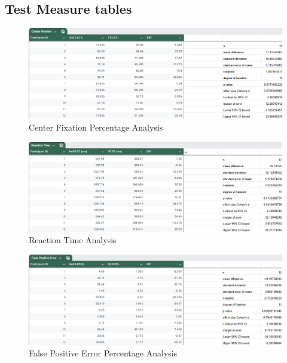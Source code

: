 \documentclass{l4proj}
\begin{document}
\begin{appendices}
\subsection{Test Measure tables}
\begin{figure}[!h]
    \centering
    \includegraphics[width=1\linewidth]{images//CSFYP data analysis/Center Fixation Pecentage Analysis.png}
    \caption{Center Fixation Percentage Analysis}
    \label{fig:CFappendix}
\end{figure}

\begin{figure}[!h]
    \centering
    \includegraphics[width=1\linewidth]{images//CSFYP data analysis/Reaction Time Analysis.png}
    \caption{Reaction Time Analysis}
    \label{fig:RTappendix}
\end{figure}

\begin{figure}[!h]
    \centering
    \includegraphics[width=1\linewidth]{images//CSFYP data analysis/False Positive Error Pecentage Analysis.png}
    \caption{False Positive Error Percentage Analysis}
    \label{fig:FPappendix}
\end{figure}


\end{appendices}
\end{document}
